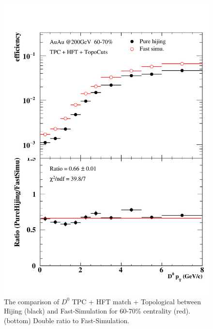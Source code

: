 \begin{figure}[htbp]
\begin{minipage}[htbp]{0.47\linewidth}
\includegraphics[width=1.0\textwidth,angle=0]{figure/Run14_D0HFT/60_70.pdf} 
\caption{ The comparison of $D^0$ TPC + HFT match + Topological between Hijing (black) and Fast-Simulation for 60-70\% centrality (red). (bottom) Double ratio to Fast-Simulation.\label{60_70}}
\end{minipage}
\end{figure}

